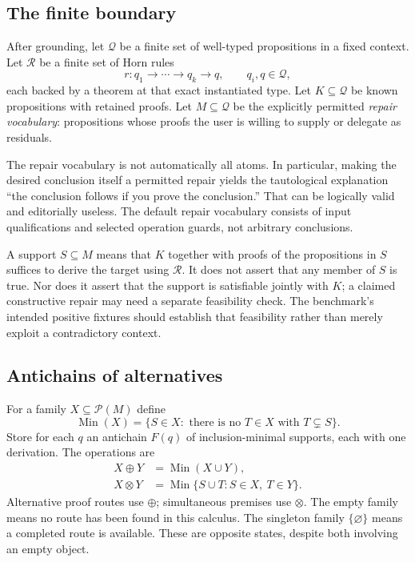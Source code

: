 \documentclass[11pt,a4paper]{article}
\newcommand{\Min}{\operatorname{Min}}\newcommand{\supp}{\operatorname{supp}}
\theoremstyle{plain}
\theoremstyle{definition}
\theoremstyle{remark}
\begin{document}
\subsection{The finite boundary}
After grounding, let $\mathcal Q$ be a finite set of well-typed propositions in a fixed context. Let $\mathcal R$ be a finite set of Horn rules
\[
 r:q_1\to\cdots\to q_k\to q,
 \qquad q_i,q\in\mathcal Q,
\]
each backed by a theorem at that exact instantiated type. Let $K\subseteq\mathcal Q$ be known propositions with retained proofs. Let $M\subseteq\mathcal Q$ be the explicitly permitted \emph{repair vocabulary}: propositions whose proofs the user is willing to supply or delegate as residuals.

The repair vocabulary is not automatically all atoms. In particular, making the desired conclusion itself a permitted repair yields the tautological explanation ``the conclusion follows if you prove the conclusion.'' That can be logically valid and editorially useless. The default repair vocabulary consists of input qualifications and selected operation guards, not arbitrary conclusions.

A support $S\subseteq M$ means that $K$ together with proofs of the propositions in $S$ suffices to derive the target using $\mathcal R$. It does not assert that any member of $S$ is true. Nor does it assert that the support is satisfiable jointly with $K$; a claimed constructive repair may need a separate feasibility check. The benchmark's intended positive fixtures should establish that feasibility rather than merely exploit a contradictory context.

\subsection{Antichains of alternatives}
For a family $X\subseteq\mathcal P(M)$ define
\[
 \Min(X)=\{S\in X:\text{ there is no }T\in X\text{ with }T\subsetneq S\}.
\]
Store for each $q$ an antichain $F(q)$ of inclusion-minimal supports, each with one derivation. The operations are
\begin{align}
 X\oplus Y&=\Min(X\cup Y),\label{eq:plus}\\
 X\otimes Y&=\Min\{S\cup T:S\in X,\ T\in Y\}.\label{eq:times}
\end{align}
Alternative proof routes use $\oplus$; simultaneous premises use $\otimes$. The empty family means no route has been found in this calculus. The singleton family $\{\varnothing\}$ means a completed route is available. These are opposite states, despite both involving an empty object.
\end{document}
